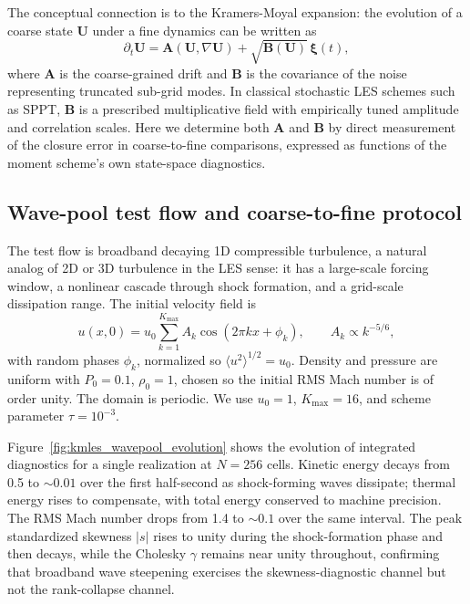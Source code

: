 \documentclass[11pt,letterpaper]{article}
\begin{document}
The conceptual connection is to the Kramers-Moyal expansion: the evolution of a coarse state $\bm{U}$ under a fine dynamics can be written as
\begin{equation}
\partial_t \bm{U} = \bm{A}(\bm{U}, \nabla \bm{U}) + \sqrt{\bm{B}(\bm{U})}\,\bm{\xi}(t),
\label{eq:km_sde}
\end{equation}
where $\bm{A}$ is the coarse-grained drift and $\bm{B}$ is the covariance of the noise representing truncated sub-grid modes. In classical stochastic LES schemes such as SPPT, $\bm{B}$ is a prescribed multiplicative field with empirically tuned amplitude and correlation scales. Here we determine both $\bm{A}$ and $\bm{B}$ by direct measurement of the closure error in coarse-to-fine comparisons, expressed as functions of the moment scheme's own state-space diagnostics.

\subsection{Wave-pool test flow and coarse-to-fine protocol}
\label{sec:kmles:wavepool}

The test flow is broadband decaying 1D compressible turbulence, a natural analog of 2D or 3D turbulence in the LES sense: it has a large-scale forcing window, a nonlinear cascade through shock formation, and a grid-scale dissipation range. The initial velocity field is
\begin{equation}
u(x, 0) = u_0 \sum_{k=1}^{K_{\max}} A_k \cos(2\pi k x + \phi_k), \qquad A_k \propto k^{-5/6},
\label{eq:ic_wavepool}
\end{equation}
with random phases $\phi_k$, normalized so $\langle u^2\rangle^{1/2} = u_0$. Density and pressure are uniform with $P_0 = 0.1$, $\rho_0 = 1$, chosen so the initial RMS Mach number is of order unity. The domain is periodic. We use $u_0 = 1$, $K_{\max} = 16$, and scheme parameter $\tau = 10^{-3}$.

Figure~\ref{fig:kmles_wavepool_evolution} shows the evolution of integrated diagnostics for a single realization at $N = 256$ cells. Kinetic energy decays from 0.5 to $\sim 0.01$ over the first half-second as shock-forming waves dissipate; thermal energy rises to compensate, with total energy conserved to machine precision. The RMS Mach number drops from 1.4 to $\sim 0.1$ over the same interval. The peak standardized skewness $|s|$ rises to unity during the shock-formation phase and then decays, while the Cholesky $\gamma$ remains near unity throughout, confirming that broadband wave steepening exercises the skewness-diagnostic channel but not the rank-collapse channel.
\end{document}
